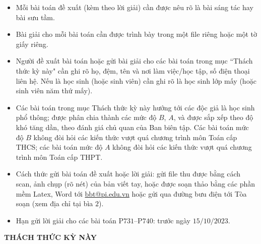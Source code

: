 \thispagestyle{thachthuctoanhocnone}
\pagestyle{thachthuctoanhoc}
\everymath{\color{thachthuctoanhoc}}
\graphicspath{{../thachthuctoanhoc/pic/}}
\begingroup
{}
\centering
\vspace*{4cm}
\endgroup
\vspace*{-8pt}
\begin{tBox}
	\begin{itemize}[leftmargin = 13pt, itemsep = 1.0pt] 
		\item Mỗi bài toán đề xuất (kèm theo lời giải) cần được nêu rõ là bài sáng tác hay bài sưu tầm.
		\item Bài giải cho mỗi bài toán cần được trình bày trong một file riêng hoặc
		một tờ giấy riêng.
		\item  Người đề xuất bài toán hoặc gửi bài giải cho các bài toán trong mục ``Thách thức kỳ này" cần ghi rõ họ, đệm, tên và nơi làm việc/học tập, số điện thoại liên hệ. Nếu là học sinh (hoặc sinh viên) cần ghi rõ là học sinh lớp mấy (hoặc sinh viên năm thứ mấy).
		\item Các bài toán trong mục Thách thức kỳ này hướng tới các độc giả là học sinh phổ thông; được phân chia thành các mức độ $B$, $A$, và được sắp xếp theo độ khó tăng dần, theo đánh giá chủ quan của Ban biên tập. Các bài toán mức độ $B$ không đòi hỏi các kiến thức vượt quá chương trình môn Toán cấp THCS; các bài toán mức độ $A$ không đòi hỏi các kiến thức vượt quá chương trình môn Toán cấp THPT.
		\item Cách thức gửi bài toán đề xuất hoặc lời giải: gửi file thu được bằng cách scan, ảnh chụp (rõ nét) của bản viết tay, hoặc được soạn thảo bằng các phần mềm Latex, Word tới \url{bbt@pi.edu.vn} hoặc gửi qua đường bưu điện tới Tòa soạn (xem địa chỉ tại bìa $2$).
		\item Hạn gửi lời giải cho các bài toán P$731$--P$740$: trước ngày $15/10/2023$.
	\end{itemize}
\end{tBox}
\begin{center}
	\vspace*{-5pt}
	\textbf{\color{thachthuctoanhoc}\color{thachthuctoanhoc}\color{thachthuctoanhoc}THÁCH THỨC KỲ NÀY}
	\vspace*{-5pt}
\end{center}
